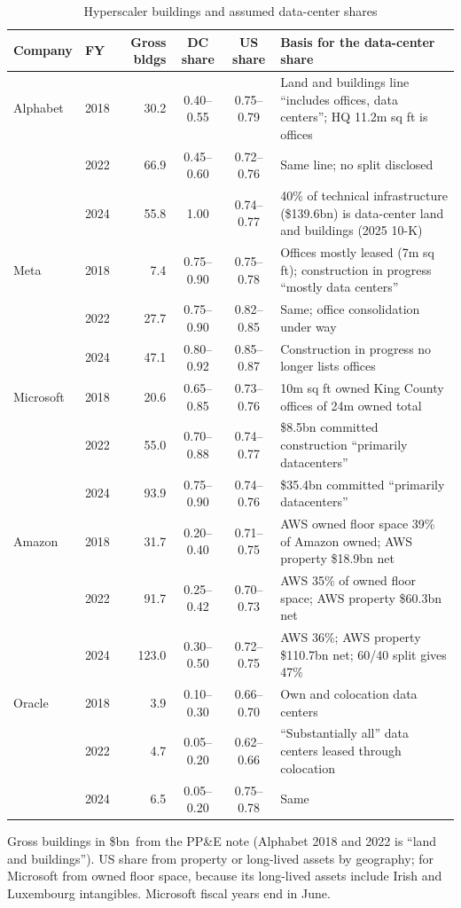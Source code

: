\documentclass[11pt]{article}
\newcommand{\bn}{\$bn}
\begin{document}
\begin{table}[ht]
\centering
\begin{threeparttable}
\caption{Hyperscaler buildings and assumed data-center shares}
\label{tab:hyp}
\footnotesize
\begin{tabular}{llrccp{6.2cm}}
\toprule
Company & FY & Gross bldgs & DC share & US share & Basis for the data-center share \\
\midrule
Alphabet & 2018 & 30.2 & 0.40--0.55 & 0.75--0.79 & Land and buildings line ``includes offices, data centers''; HQ 11.2m sq ft is offices \\
 & 2022 & 66.9 & 0.45--0.60 & 0.72--0.76 & Same line; no split disclosed \\
 & 2024 & 55.8 & 1.00 & 0.74--0.77 & 40\% of technical infrastructure (\$139.6bn) is data-center land and buildings (2025 10-K) \\
Meta & 2018 & 7.4 & 0.75--0.90 & 0.75--0.78 & Offices mostly leased (7m sq ft); construction in progress ``mostly data centers'' \\
 & 2022 & 27.7 & 0.75--0.90 & 0.82--0.85 & Same; office consolidation under way \\
 & 2024 & 47.1 & 0.80--0.92 & 0.85--0.87 & Construction in progress no longer lists offices \\
Microsoft & 2018 & 20.6 & 0.65--0.85 & 0.73--0.76 & 10m sq ft owned King County offices of 24m owned total \\
 & 2022 & 55.0 & 0.70--0.88 & 0.74--0.77 & \$8.5bn committed construction ``primarily datacenters'' \\
 & 2024 & 93.9 & 0.75--0.90 & 0.74--0.76 & \$35.4bn committed ``primarily datacenters'' \\
Amazon & 2018 & 31.7 & 0.20--0.40 & 0.71--0.75 & AWS owned floor space 39\% of Amazon owned; AWS property \$18.9bn net \\
 & 2022 & 91.7 & 0.25--0.42 & 0.70--0.73 & AWS 35\% of owned floor space; AWS property \$60.3bn net \\
 & 2024 & 123.0 & 0.30--0.50 & 0.72--0.75 & AWS 36\%; AWS property \$110.7bn net; 60/40 split gives 47\% \\
Oracle & 2018 & 3.9 & 0.10--0.30 & 0.66--0.70 & Own and colocation data centers \\
 & 2022 & 4.7 & 0.05--0.20 & 0.62--0.66 & ``Substantially all'' data centers leased through colocation \\
 & 2024 & 6.5 & 0.05--0.20 & 0.75--0.78 & Same \\
\bottomrule
\end{tabular}
\begin{tablenotes}\footnotesize
\item Gross buildings in \bn\ from the PP\&E note (Alphabet 2018 and 2022 is ``land and buildings''). US share from property or long-lived assets by geography; for Microsoft from owned floor space, because its long-lived assets include Irish and Luxembourg intangibles. Microsoft fiscal years end in June.
\end{tablenotes}
\end{threeparttable}
\end{table}
\end{document}
